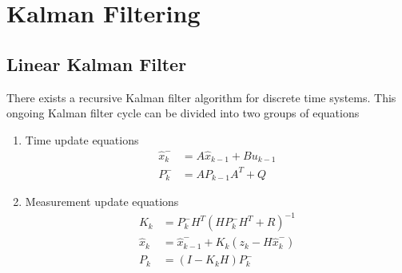\chapter{Kalman Filtering}

\section{Linear Kalman Filter}
There exists a recursive Kalman filter algorithm for discrete time systems.\cite{IntroKF} This ongoing Kalman filter cycle can be divided into two groups of equations
\newline
\begin{enumerate}
	\item Time update equations
	\begin{equation}\label{TupEq}
		\begin{aligned}
    			\hat{x}_{k}^{-} &= A\hat{x}_{k-1}+Bu_{k-1} \\
    			P_{k}^{-} &= AP_{k-1}A^{T}+Q
  		\end{aligned}
	\end{equation}
	\item Measurement update equations
	\begin{equation}\label{MupEq}
		\begin{aligned}
    			K_{k} &= P_{k}^{-}H^{T}(HP_{k}^{-}H^{T}+R)^{-1} \\
    			\hat{x}_{k} &= \hat{x}_{k-1}^{-}+K_{k}(z_{k}-H\hat{x}_{k}^{-}) \\
			P_{k} &= (I-K_{k}H)P_{k}^{-}
  		\end{aligned}
	\end{equation}
\end{enumerate}

